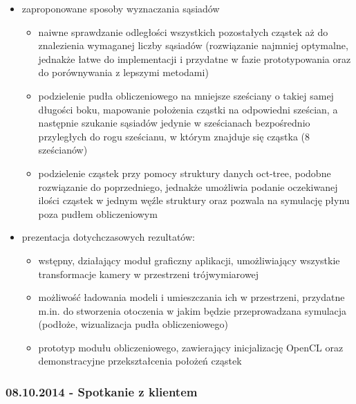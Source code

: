 \documentclass[polish, 12pt]{aghthesis}
\begin{document}
			\begin{itemize}
			
				\item zaproponowane sposoby wyznaczania sąsiadów
				
					\begin{itemize}
					
						\item naiwne sprawdzanie odległości wszystkich pozostałych cząstek aż do znalezienia wymaganej liczby sąsiadów (rozwiązanie najmniej optymalne, jednakże łatwe do implementacji i przydatne w fazie prototypowania oraz do porównywania z lepszymi metodami)
						\item podzielenie pudła obliczeniowego na mniejsze sześciany o takiej samej długości boku, mapowanie położenia cząstki na odpowiedni sześcian, a następnie szukanie sąsiadów jedynie w sześcianach bezpośrednio przyległych do rogu sześcianu, w którym znajduje się cząstka (8 sześcianów)
						\item podzielenie cząstek przy pomocy struktury danych oct-tree, podobne rozwiązanie do poprzedniego, jednakże umożliwia podanie oczekiwanej ilości cząstek w jednym węźle struktury oraz pozwala na symulację płynu poza pudłem obliczeniowym
					
					\end{itemize}
					
				\item prezentacja dotychczasowych rezultatów:
				
					\begin{itemize}
					
						\item wstępny, działający moduł graficzny aplikacji, umożliwiający wszystkie transformacje kamery w przestrzeni trójwymiarowej
						\item możliwość ładowania modeli i umieszczania ich w przestrzeni, przydatne m.in. do stworzenia otoczenia w jakim będzie przeprowadzana symulacja (podłoże, wizualizacja pudła obliczeniowego)
						\item prototyp modułu obliczeniowego, zawierający inicjalizację OpenCL oraz demonstracyjne przekształcenia położeń cząstek
					
					\end{itemize}
			
			\end{itemize}
		
		\subsubsection*{08.10.2014 - Spotkanie z klientem}
		
\end{document}
